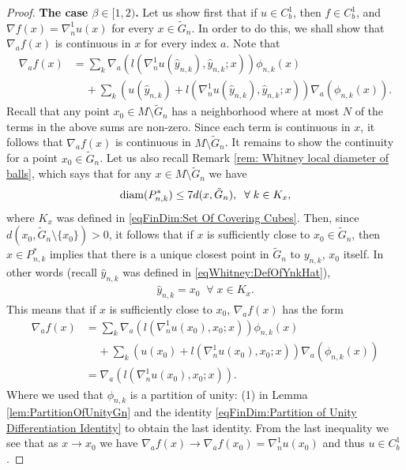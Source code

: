 \documentclass[11pt,reqno]{amsart}
\numberwithin{equation}{section}
\theoremstyle{plain}
\def\diam{\textnormal{diam}}
\begin{document}
\begin{proof}
  \textbf{The case $\beta\in [1,2)$.} Let us show first that if $u \in C^1_b$, then $f\in C^1_b$, and $\nabla f(x)=\nabla_n^1u(x)$ for every $x\in \tilde G_n$. In order to do this, we shall show that $\nabla_a f(x)$ is continuous in $x$ for every index $a$. Note that 
  \begin{align*}
      \nabla_{a}f(x) & = \sum \limits_{k} \nabla_a \left ( l( \nabla^1_n u (\hat y_{n,k}),\hat y_{n,k};x)\right )\phi_{n,k}(x)\\
  	& \;\;\;\;+\sum \limits_{k} \left ( u(\hat y_{n,k})+l( \nabla^1_n u (\hat y_{n,k}),\hat y_{n,k};x)\right )\nabla_a \left ( \phi_{n,k}(x) \right ).
  \end{align*}
  Recall that any point $x_0\in M\setminus \tilde G_n$ has a neighborhood where at most $N$ of the terms in the above sums are non-zero. Since each term is continuous in $x$, it follows that $\nabla_af(x)$ is continuous in $M\setminus \tilde G_n$. It remains to show the continuity for a point $x_0 \in \tilde G_n$. Let us also recall Remark \ref{rem: Whitney local diameter of balls}, which says that for any $x\in M\setminus \tilde G_n$ we have
  \begin{align*}
    \diam(P_{n,k}^*)\leq 7d(x,\tilde G_n),\;\;\forall\;k\in K_x,
  \end{align*}
  where $K_x$ was defined in \eqref{eqFinDim:Set Of Covering Cubes}. Then, since $d(x_0,\tilde G_n \setminus \{x_0\})>0$, it follows that if $x$ is sufficiently close to $x_0\in \tilde G_n$, then $x\in P_{n,k}^*$ implies that there is a unique closest point in $\tilde G_n$ to $y_{n,k}$, $x_0$ itself. In other words (recall $\hat y_{n,k}$ was defined in \eqref{eqWhitney:DefOfYnkHat}),
  \begin{align*}
    \hat y_{n,k} = x_0\;\;\forall\;x\in K_x.
  \end{align*}
  This means that if $x$ is sufficiently close to $x_0$, $\nabla_{a}f(x)$ has the form
  \begin{align*}
      \nabla_{a}f(x) & = \sum \limits_{k} \nabla_a \left ( l( \nabla^1_n u (x_0),x_0;x)\right )\phi_{n,k}(x)\\
  	& \;\;\;\;+\sum \limits_{k} \left ( u(x_0)+l( \nabla^1_n u (x_0),x_0;x)\right )\nabla_a \left ( \phi_{n,k}(x) \right )\\
        &  = \nabla_a \left ( l( \nabla^1_n u (x_0),x_0;x)\right ).  
  \end{align*}
  Where we used that $\phi_{n,k}$ is a partition of unity: (1) in Lemma \ref{lem:PartitionOfUnityGn} and the identity \eqref{eqFinDim:Partition of Unity Differentiation Identity} to obtain the last identity. From the last inequality we see that as $x\to x_0$ we have $\nabla_a f(x) \to \nabla_af(x_0) = \nabla_n^1u(x_0)$ and thus $u \in C^1_b$.
  

\end{proof}
\end{document}
